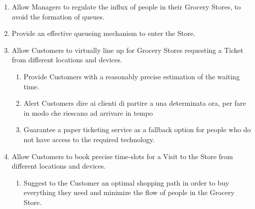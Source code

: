 \documentclass[a4paper, 10pt, oneside]{article}
\newcommand*{\lorenzo}[1]{\textcolor{BurntOrange}{#1}}
\begin{document}
\begin{enumerate}[label={G.\arabic{*}}]
    \item \label{goal:influx} Allow Managers to regulate the influx of people in their Grocery Stores, to avoid the formation of queues.
    \item Provide an effective queueing mechanism to enter the Store.
    \item \label{goal:enqueue} Allow Customers to virtually line up for Grocery Stores requesting a Ticket from different locations and devices.
    \begin{enumerate}[label={\ref{goal:enqueue}.\arabic{*}}]
        \item \label{goal:enque:time} Provide Customers with a reasonably precise estimation of the waiting time.
        \item \label{goal:enque:alert} Alert Customers \lorenzo{dire ai clienti di partire a una determinata ora, per fare in modo che riescano ad arrivare in tempo} %
        \item \label{goal:enque:fallback} Guarantee a paper ticketing service as a fallback option for people who do not have access to the required technology.
    \end{enumerate}
    \item \label{goal:visit} Allow Customers to book precise time-slots for a Visit to the Store from different locations and devices.
    \begin{enumerate}[label={\ref{goal:visit}.\arabic{*}}]
        \item \label{goal:visit:path} Suggest to the Customer an optimal shopping path in order to buy everything they need and minimize the flow of people in the Grocery Store.

\end{enumerate}
\end{enumerate}
\end{document}
